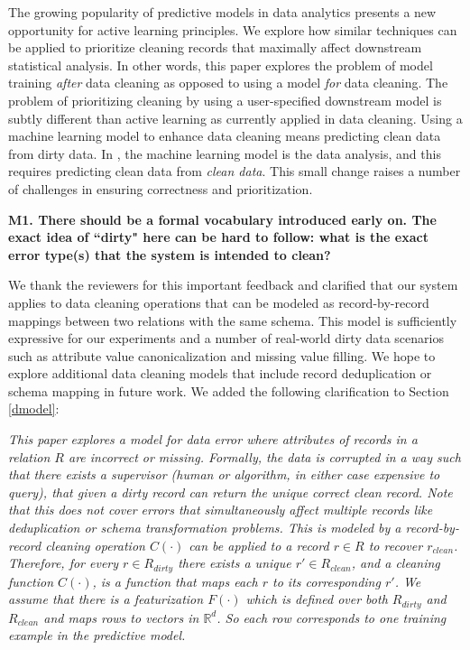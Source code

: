 The growing popularity of predictive models in data analytics \cite{bdas, alexandrov2014stratosphere, crotty2014tupleware, hellerstein2012madlib} presents a new opportunity for active learning principles.
We explore how similar techniques can be applied to prioritize cleaning records that maximally affect downstream statistical analysis.
In other words, this paper explores the problem of model training \emph{after} data cleaning as opposed to using a model \emph{for} data cleaning.
The problem of prioritizing cleaning by using a user-specified downstream model is subtly different than active learning as currently applied in data cleaning.
Using a machine learning model to enhance data cleaning means predicting clean data from dirty data.
In \sys, the machine learning model is the data analysis, and this requires predicting clean data from \emph{clean data}.
This small change raises a number of challenges in ensuring correctness and prioritization.


\vspace{0.5em}

\noindent\noindent \textbf{M1. There should be a formal vocabulary introduced early on. The exact idea of ``dirty" here can be hard to follow: what is the exact error type(s) that the system is intended to clean?}

\vspace{0.5em}

We thank the reviewers for this important feedback and clarified that our system applies to data cleaning operations that can be modeled as record-by-record mappings between two relations with the same schema.
This model is sufficiently expressive for our experiments and a number of real-world dirty data scenarios such as attribute value canonicalization and missing value filling.
We hope to explore additional data cleaning models that include record deduplication or schema mapping in future work.
We added the following clarification to Section \ref{dmodel}:

\emph{This paper explores a model for data error where attributes of records in a relation $R$ are incorrect or missing.
Formally, the data is corrupted in a way such that there exists a supervisor (human or algorithm, in either case expensive to query), that given a dirty record can return the unique correct clean record.
Note that this does not cover errors that simultaneously affect multiple records like deduplication or schema transformation problems.
This is modeled by a record-by-record cleaning operation $C(\cdot)$ can be applied to a record $r \in R$ to recover $r_{clean}$.
Therefore, for every $r \in R_{dirty}$ there exists a unique $r' \in R_{clean}$, and a cleaning function $C(\cdot)$, is a function that maps each $r$ to its corresponding $r'$.
We assume that there is a featurization $F(\cdot)$ which is defined over both $R_{dirty}$ and $R_{clean}$ and maps rows to vectors in $\mathbb{R}^d$.
So each row corresponds to one training example in the predictive model.}

